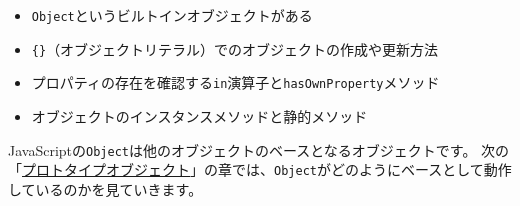 \begin{itemize}
\item
  \texttt{Object}というビルトインオブジェクトがある
\item
  \texttt{\{\}}（オブジェクトリテラル）でのオブジェクトの作成や更新方法
\item
  プロパティの存在を確認する\texttt{in}演算子と\texttt{hasOwnProperty}メソッド
\item
  オブジェクトのインスタンスメソッドと静的メソッド
\end{itemize}

JavaScriptの\texttt{Object}は他のオブジェクトのベースとなるオブジェクトです。
次の「\hyperlink{prototype-object}{プロトタイプオブジェクト}」の章では、\texttt{Object}がどのようにベースとして動作しているのかを見ていきます。
